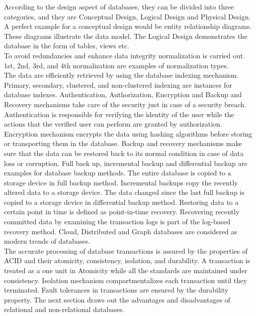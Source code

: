 \documentclass[a4Paper,12pt]{report}
\begin{document}
According to the design aspect of databases, they can be divided into three categories, and they are Conceptual Design, Logical Design and Physical Design. A perfect example for a conceptual design would be entity relationship diagrams. These diagrams illustrate the data model. The Logical Design demonstrates the database in the form of tables, views etc.\\[12pt]
To avoid redundancies and enhance data integrity normalization is carried out. 1st, 2nd, 3rd, and 4th normalization are examples of normalization types.\\[12pt]
The data are efficiently retrieved by using the database indexing mechanism. Primary, secondary, clustered, and non-clustered indexing are instances for database indexes. Authentication, Authorization, Encryption and Backup and Recovery mechanisms take care of the security just in case of a security breach. Authentication is responsible for verifying the identity of the user while the actions that the verified user can perform are granted by authorization. Encryption mechanism encrypts the data using hashing algorithms before storing or transporting them in the database. Backup and recovery mechanisms make sure that the data can be restored back to its normal condition in case of data loss or corruption. Full back up, incremental backup and differential backup are examples for database backup methods. The entire database is copied to a storage device in full backup method. Incremental backups copy the recently altered data to a storage device. The data changed since the last full backup is copied to a storage device in differential backup method. Restoring data to a certain point in time is defined as point-in-time recovery. Recovering recently committed data by examining the transaction logs is part of the log-based recovery method. Cloud, Distributed and Graph databases are considered as modern trends of databases.\\[12pt]
The accurate processing of database transactions is assured by the properties of ACID and their atomicity, consistency, isolation, and durability. A transaction is treated as a one unit in Atomicity while all the standards are maintained under consistency. Isolation mechanism compartmentalizes each transaction until they terminated. Fault tolerances in transactions are ensured by the durability property. The next section draws out the advantages and disadvantages of relational and non-relational databases.
\end{document}
